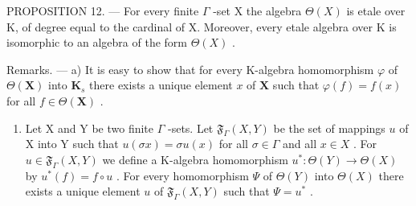 PROPOSITION 12. --- For every finite \(\Gamma\) -set X the algebra \(\Theta(X)\) is etale over K, of degree equal to the cardinal of X. Moreover, every etale algebra over K is isomorphic to an algebra of the form \(\Theta(X)\) .

Remarks. --- a) It is easy to show that for every K-algebra homomorphism \(\varphi\) of \(\Theta(\mathbf{X})\) into \(\mathbf{K}_s\) there exists a unique element \(x\) of \(\mathbf{X}\) such that \(\varphi(f) = f(x)\) for all \(f \in \Theta(\mathbf{X})\) .

\begin{enumerate}
\def\labelenumi{\arabic{enumi})}
\setcounter{enumi}{1}
\tightlist
\item
  Let X and Y be two finite \(\Gamma\) -sets. Let \(\mathfrak{F}_{\Gamma}(X, Y)\) be the set of mappings \(u\) of X into Y such that \(u(\sigma x) = \sigma u(x)\) for all \(\sigma \in \Gamma\) and all \(x \in X\) . For \(u \in \mathfrak{F}_{\Gamma}(X, Y)\) we define a K-algebra homomorphism \(u^{*}: \Theta(Y) \to \Theta(X)\) by \(u^{*}(f) = f \circ u\) . For every homomorphism \(\Psi\) of \(\Theta(Y)\) into \(\Theta(X)\) there exists a unique element \(u\) of \(\mathfrak{F}_{\Gamma}(X, Y)\) such that \(\Psi = u^{*}\) .
\end{enumerate}

